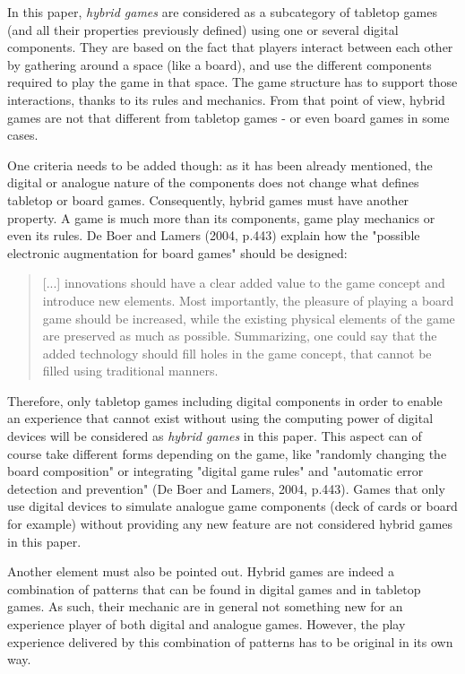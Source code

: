 In this paper, \textit{hybrid games} are considered as a subcategory of tabletop games (and all their properties previously defined) using one or several digital components. They are based on the fact that players interact between each other by gathering around a space (like a board), and use the different components required to play the game in that space. The game structure has to support those interactions, thanks to its rules and mechanics. From that point of view, hybrid games are not that different from tabletop games - or even board games in some cases.

One criteria needs to be added though: as it has been already mentioned, the digital or analogue nature of the components does not change what defines tabletop or board games. Consequently, hybrid games must have another property. A game is much more than its components, game play mechanics or even its rules. De Boer and Lamers (2004, p.443)\cite{chap:aug} explain how the "possible electronic augmentation for board games" should be designed:

\begin{quotation}
[...] innovations should have a clear added value to the game concept and introduce new elements. Most importantly, the pleasure of playing a board game should be increased, while the existing physical elements of the game are preserved as much as possible. Summarizing, one could say that the added technology should fill holes in the game concept, that cannot be filled using traditional manners.
\end{quotation}

Therefore, only tabletop games including digital components in order to enable an experience that cannot exist without using the computing power of digital devices will be considered as \textit{hybrid games} in this paper. This aspect can of course take different forms depending on the game, like "randomly changing the board composition" or integrating "digital game rules" and "automatic error detection and prevention" (De Boer and Lamers, 2004, p.443)\cite{chap:aug}. Games that only use digital devices to simulate analogue game components (deck of cards or board for example) without providing any new feature are not considered hybrid games in this paper.

Another element must also be pointed out. Hybrid games are indeed a combination of patterns that can be found in digital games and in tabletop games. As such, their mechanic are in general not something new for an experience player of both digital and analogue games. However, the play experience delivered by this combination of patterns has to be original in its own way.

